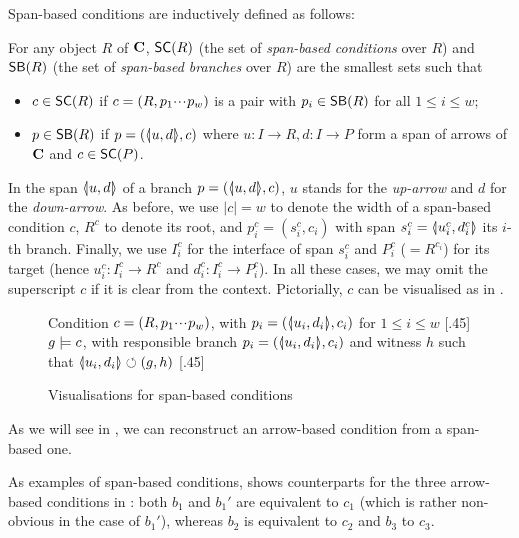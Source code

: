 \medskip\noindent
Span-based conditions are inductively defined as follows:

\begin{definition}
  For any object $R$ of $\mathbf{C}$, $\SC R$ (the set of \emph{span-based conditions} over $R$) and $\SB R$ (the set of \emph{span-based branches} over $R$) are the smallest sets such that
  \begin{itemize}
  \item $c\in \SC R$ if $c=(R,p_1{\cdotp\mkern-2mu\cdotp\mkern-2mu\cdotp\mkern1mu} p_w)$ is a pair with $p_i\in \SB R$ for all $1\leq i\leq w$;
  \item $p\in \SB R$ if $p=(\spanof u d,c)$ where $u: I\to R, d:I\to P$ form a span of arrows of $\mathbf{C}$ and $c\in \SC P$.
  \end{itemize}
\end{definition}
%
In the span $\spanof u d$ of a branch $p=(\spanof u d,c)$, $u$ stands for the \emph{up-arrow} and $d$ for the \emph{down-arrow}. As before, we use $|c|=w$ to denote the width of a span-based condition $c$, $R^c$ to denote its root, and $p^c_i=(s^c_i,c_i)$ with span $s^c_i=\spanof{u^c_i}{d^c_i}$ its $i$-th branch. Finally, we use $I^c_i$ for the interface of span $s^c_i$ and $P^c_i$ ($=R^{c_i}$) for its target (hence $u^c_i:I^c_i\to R^c$ and $d^c_i:I^c_i\rightarrow P^c_i$). In all these cases, we may omit the superscript $c$ if it is clear from the context. Pictorially, $c$ can be visualised as in .
%
\begin{figure}[t]
\centering
\subcaptionbox
  {Condition $c=(R,p_1{\cdotp\mkern-2mu\cdotp\mkern-2mu\cdotp\mkern1mu} p_w)$, with $p_i=(\spanof{u_i}{d_i},c_i)$ for $1\leq i\leq w$
   }
  [.45\textwidth]
  {}
\qquad
\subcaptionbox
  {$g\models c$, with responsible branch $p_i=(\spanof{u_i}{d_i},c_i)$ and witness $h$ such that $\spanof{u_i}{d_i}\commutes (g,h)$
   }
  [.45\textwidth]
  {}
\vspace*{-2mm}
\caption{Visualisations for span-based conditions}
\end{figure}
%
As we will see in , we can reconstruct an arrow-based condition from a span-based one.

As examples of span-based conditions,  shows counterparts for the three arrow-based conditions in : both $b_1$ and $b_1'$ are equivalent to $c_1$ (which is rather non-obvious in the case of $b_1'$), whereas $b_2$ is equivalent to $c_2$ and $b_3$ to $c_3$.

